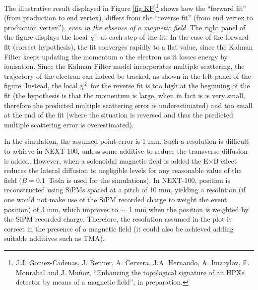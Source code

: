The illustrative result displayed in Figure \ref{fig.KF}\footnote{J.J. Gomez-Cadenas, J. Renner, A. Cervera, J.A. Hernando, A. Imzaylov, F. Monrabal and J. Muñoz, ``Enhancing the topological signature of an HPXe detector by means of a magnetic field'', in preparation.} shows how the ``forward fit'' (from production to end vertex), differs from the ``reverse fit'' (from end vertex to production vertex''), {\em even in the absence of a magnetic field}.  The right panel of the figure displays the local $\chi^2$~at each step of the fit. In the case of the forward fit (correct hypothesis), the fit converges rapidly to a flat value, since the Kalman Filter keeps updating the momentum o the electron as it losses energy by ionisation. Since the Kalman Filter model incorporates multiple scattering, the trajectory of the electron can indeed be tracked, as shown in the left panel of the figure. Instead, the local $\chi^2$~for the reverse fit is too high at the beginning of the fit (the hypothesis is that the momentum is large, when in fact is is very small, therefore the predicted multiple scattering error is underestimated) and too small at the end of the fit (where the situation is reversed and thus the predicted multiple scattering error is overestimated).  

In the simulation, the assumed point-error is 1 mm. Such a resolution is difficult to achieve in NEXT-100, unless some additive to reduce the transverse diffusion is added. However, when a solenoidal magnetic field is added the E$\times$B effect reduces the lateral diffusion to negligible levels for any reasonable value of the field ($B=0.1$~Tesla is used for the simulations). In NEXT-100, position is reconstructed using SiPMs spaced at a pitch of 10 mm, yielding a resolution (if one would not make use of the SiPM recorded charge to weight the event position) of 3 mm, which improves to $\sim$~1 mm when the position is weighted by the SiPM recorded charge. Therefore, the resolution assumed in the plot is correct in the presence of a magnetic field (it could also be achieved adding suitable additives such as TMA). 

